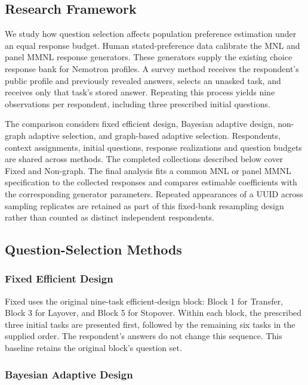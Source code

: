 \subsection{Research Framework}

We study how question selection affects population preference estimation under
an equal response budget. Human stated-preference data calibrate the MNL and
panel MMNL response generators. These generators supply the existing choice
response bank for Nemotron profiles. A survey method receives the respondent's
public profile and previously revealed answers, selects an unasked task, and
receives only that task's stored answer. Repeating this process yields nine
observations per respondent, including three prescribed initial questions.

The comparison considers fixed efficient design, Bayesian adaptive design,
non-graph adaptive selection, and graph-based adaptive selection. Respondents,
context assignments, initial questions, response realizations and question
budgets are shared across methods. The completed collections described below
cover Fixed and Non-graph. The final analysis fits a common MNL or panel MMNL
specification to the collected responses and compares estimable coefficients
with the corresponding generator parameters. Repeated appearances of a UUID
across sampling replicates are retained as part of this fixed-bank resampling
design rather than counted as distinct independent respondents.

\subsection{Question-Selection Methods}
\subsubsection{Fixed Efficient Design}

Fixed uses the original nine-task efficient-design block: Block 1 for Transfer,
Block 3 for Layover, and Block 5 for Stopover. Within each block, the prescribed
three initial tasks are presented first, followed by the remaining six tasks
in the supplied order. The respondent's answers do not change this sequence.
This baseline retains the original block's question set.

\subsubsection{Bayesian Adaptive Design}

